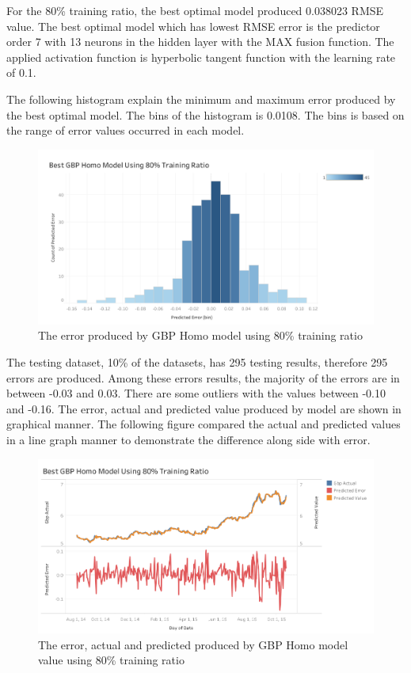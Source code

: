 {{{{{{{{{{{{{{{{{	For the 80\% training ratio, the best optimal model  produced 0.038023 RMSE value. The best optimal model which has lowest RMSE error is the predictor order 7 with 13 neurons in the hidden layer with the MAX fusion function. The applied activation function is hyperbolic tangent function with the learning rate of 0.1.
	
	The following histogram explain the minimum and maximum error produced by the best optimal model. The bins of the histogram is 0.0108. The bins is based on the range of error values occurred in each model.
	
	\begin{figure}[hbt!]\centering
		\includegraphics[width=1\textwidth]{homo_gbp_80}
		\caption{The error produced by GBP Homo model using 80\% training ratio}
	\end{figure}
	
	The testing dataset, 10\% of the datasets, has 295 testing results, therefore 295 errors are produced. Among these errors results, the majority of the errors are in between -0.03 and 0.03. There are some outliers with the values between -0.10 and -0.16. The error, actual and predicted value produced by model are shown in graphical manner. The following figure   compared the actual and predicted values in a line graph manner to demonstrate the difference along side with error.
	
	
	\begin{figure}[hbt!]\centering
		\includegraphics[width=1\textwidth]{best_gbp_homo_APV_80}
		\caption{The error, actual and predicted produced by GBP Homo model  value using 80\% training ratio }
	\end{figure}
	
}}}}}}}}}}}}}}}}}
